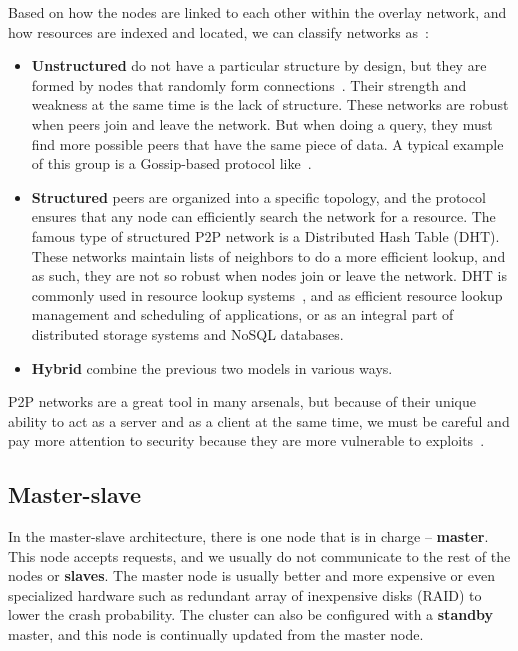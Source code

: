 Based on how the nodes are linked to each other within the overlay network, and how resources are indexed and located, we can classify networks as~\cite{KamelSE07}:

\begin{itemize}
	\item \textbf{Unstructured} do not have a particular structure by design, but they are formed by nodes that randomly form connections~\cite{FilaliBHB11}. Their strength and weakness at the same time is the lack of structure. These networks are robust when peers join and leave the network. But when doing a query, they must find more possible peers that have the same piece of data. A typical example of this group is a Gossip-based protocol like~\cite{DasGM02}.
	\item \textbf{Structured} peers are organized into a specific topology, and the protocol ensures that any node can efficiently search the network for a resource. The famous type of structured P2P network is a Distributed Hash Table (DHT). These networks maintain lists of neighbors to do a more efficient lookup, and as such, they are not so robust when nodes join or leave the network. DHT is commonly used in resource lookup systems~\cite{StoicaMKKB01}, and as efficient resource lookup management and scheduling of applications, or as an integral part of distributed storage systems and NoSQL\cite{Leavitt10} databases.
	\item \textbf{Hybrid} combine the previous two models in various ways.
\end{itemize}

\noindent
P2P networks are a great tool in many arsenals, but because of their unique ability to act as a server and as a client at the same time, we must be careful and pay more attention to security because they are more vulnerable to exploits~\cite{0024003}.
%
%
\subsection{Master-slave}\label{sec:master_slave}
%
In the master-slave architecture, there is one node that is in charge -- \textbf{master}. This node accepts requests, and we usually do not communicate to the rest of the nodes or \textbf{slaves}. The master node is usually better and more expensive or even specialized hardware such as redundant array of inexpensive disks (RAID) to lower the crash probability. The cluster can also be configured with a \textbf{standby} master, and this node is continually updated from the master node.


